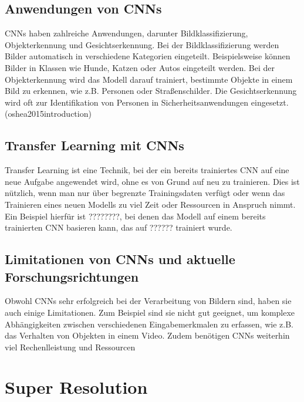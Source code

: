     
    \subsection{Anwendungen von CNNs}
    
        CNNs haben zahlreiche Anwendungen, darunter Bildklassifizierung, Objekterkennung und Gesichtserkennung.      
        Bei der Bildklassifizierung werden Bilder automatisch in verschiedene Kategorien eingeteilt.      
        Beispielsweise können Bilder in Klassen wie Hunde, Katzen oder Autos eingeteilt werden.      
        Bei der Objekterkennung wird das Modell darauf trainiert, bestimmte Objekte in einem Bild zu erkennen, wie z.B.      Personen oder Straßenschilder.      
        Die Gesichtserkennung wird oft zur Identifikation von Personen in Sicherheitsanwendungen eingesetzt.
        \footfullcite(oshea2015introduction)
    \subsection{Transfer Learning mit CNNs}
    
        Transfer Learning ist eine Technik, bei der ein bereits trainiertes CNN auf eine neue Aufgabe angewendet wird, ohne es von Grund auf neu zu trainieren.      
        Dies ist nützlich, wenn man nur über begrenzte Trainingsdaten verfügt oder wenn das Trainieren eines neuen Modells zu viel Zeit oder Ressourcen in Anspruch nimmt.      
        Ein Beispiel hierfür ist ????????, bei denen das Modell auf einem bereits trainierten CNN basieren kann, das auf ?????? trainiert wurde.
    \subsection{Limitationen von CNNs und aktuelle Forschungsrichtungen}

        Obwohl CNNs sehr erfolgreich bei der Verarbeitung von Bildern sind, haben sie auch einige Limitationen.      
        Zum Beispiel sind sie nicht gut geeignet, um komplexe Abhängigkeiten zwischen verschiedenen Eingabemerkmalen zu erfassen, wie z.B.      das Verhalten von Objekten in einem Video.
        Zudem benötigen CNNs weiterhin viel Rechenlleistung und Ressourcen

\section{Super Resolution}
